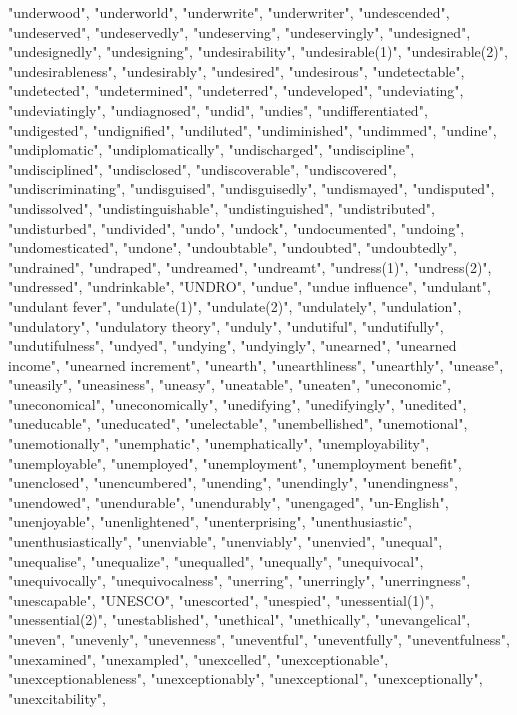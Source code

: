 "underwood",
"underworld",
"underwrite",
"underwriter",
"undescended",
"undeserved",
"undeservedly",
"undeserving",
"undeservingly",
"undesigned",
"undesignedly",
"undesigning",
"undesirability",
"undesirable(1)",
"undesirable(2)",
"undesirableness",
"undesirably",
"undesired",
"undesirous",
"undetectable",
"undetected",
"undetermined",
"undeterred",
"undeveloped",
"undeviating",
"undeviatingly",
"undiagnosed",
"undid",
"undies",
"undifferentiated",
"undigested",
"undignified",
"undiluted",
"undiminished",
"undimmed",
"undine",
"undiplomatic",
"undiplomatically",
"undischarged",
"undiscipline",
"undisciplined",
"undisclosed",
"undiscoverable",
"undiscovered",
"undiscriminating",
"undisguised",
"undisguisedly",
"undismayed",
"undisputed",
"undissolved",
"undistinguishable",
"undistinguished",
"undistributed",
"undisturbed",
"undivided",
"undo",
"undock",
"undocumented",
"undoing",
"undomesticated",
"undone",
"undoubtable",
"undoubted",
"undoubtedly",
"undrained",
"undraped",
"undreamed",
"undreamt",
"undress(1)",
"undress(2)",
"undressed",
"undrinkable",
"UNDRO",
"undue",
"undue influence",
"undulant",
"undulant fever",
"undulate(1)",
"undulate(2)",
"undulately",
"undulation",
"undulatory",
"undulatory theory",
"unduly",
"undutiful",
"undutifully",
"undutifulness",
"undyed",
"undying",
"undyingly",
"unearned",
"unearned income",
"unearned increment",
"unearth",
"unearthliness",
"unearthly",
"unease",
"uneasily",
"uneasiness",
"uneasy",
"uneatable",
"uneaten",
"uneconomic",
"uneconomical",
"uneconomically",
"unedifying",
"unedifyingly",
"unedited",
"uneducable",
"uneducated",
"unelectable",
"unembellished",
"unemotional",
"unemotionally",
"unemphatic",
"unemphatically",
"unemployability",
"unemployable",
"unemployed",
"unemployment",
"unemployment benefit",
"unenclosed",
"unencumbered",
"unending",
"unendingly",
"unendingness",
"unendowed",
"unendurable",
"unendurably",
"unengaged",
"un-English",
"unenjoyable",
"unenlightened",
"unenterprising",
"unenthusiastic",
"unenthusiastically",
"unenviable",
"unenviably",
"unenvied",
"unequal",
"unequalise",
"unequalize",
"unequalled",
"unequally",
"unequivocal",
"unequivocally",
"unequivocalness",
"unerring",
"unerringly",
"unerringness",
"unescapable",
"UNESCO",
"unescorted",
"unespied",
"unessential(1)",
"unessential(2)",
"unestablished",
"unethical",
"unethically",
"unevangelical",
"uneven",
"unevenly",
"unevenness",
"uneventful",
"uneventfully",
"uneventfulness",
"unexamined",
"unexampled",
"unexcelled",
"unexceptionable",
"unexceptionableness",
"unexceptionably",
"unexceptional",
"unexceptionally",
"unexcitability",
